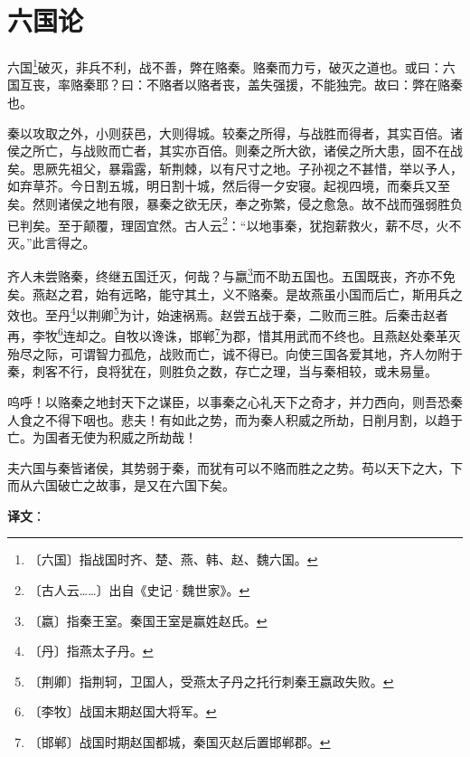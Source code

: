 \documentclass[12pt,UTF-8,openany,a4]{ctexbook}
\begin{document}
\chapter{六国论}

\begin{large}
    
    六国\footnote{〔六国〕\yiwen 指战国时齐、楚、燕、韩、赵、魏六国。}破灭，非兵不利，战不善，弊在赂秦。赂秦而力亏，破灭之道也。或曰：六国互丧，率赂秦耶？曰：不赂者以赂者丧，盖失强援，不能独完。故曰：弊在赂秦也。
    
    秦以攻取之外，小则获邑，大则得城。较秦之所得，与战胜而得者，其实百倍。诸侯之所亡，与战败而亡者，其实亦百倍。则秦之所大欲，诸侯之所大患，固不在战矣。思厥先祖父，暴霜露，斩荆棘，以有尺寸之地。子孙视之不甚惜，举以予人，如弃草芥。今日割五城，明日割十城，然后得一夕安寝。起视四境，而秦兵又至矣。然则诸侯之地有限，暴秦之欲无厌，奉之弥繁，侵之愈急。故不战而强弱胜负已判矣。至于颠覆，理固宜然。古人云\footnote{〔古人云……〕\yiwen 出自《史记·魏世家》。}：“以地事秦，犹抱薪救火，薪不尽，火不灭。”此言得之。
    
    齐人未尝赂秦，终继五国迁灭，何哉？与嬴\footnote{〔嬴〕\yiwen 指秦王室。秦国王室是赢姓赵氏。}而不助五国也。五国既丧，齐亦不免矣。燕赵之君，始有远略，能守其土，义不赂秦。是故燕虽小国而后亡，斯用兵之效也。至丹\footnote{〔丹〕\yiwen \yiwen 指燕太子丹。}以荆卿\footnote{〔荆卿〕\yiwen 指荆轲，卫国人，受燕太子丹之托行刺秦王嬴政失败。}为计，始速祸焉。赵尝五战于秦，二败而三胜。后秦击赵者再，李牧\footnote{〔李牧〕\yiwen 战国末期赵国大将军。}连却之。自牧以谗诛，邯郸\footnote{〔邯郸〕\yiwen 战国时期赵国都城，秦国灭赵后置邯郸郡。}为郡，惜其用武而不终也。且燕赵处秦革灭殆尽之际，可谓智力孤危，战败而亡，诚不得已。向使三国各爱其地，齐人勿附于秦，刺客不行，良将犹在，则胜负之数，存亡之理，当与秦相较，或未易量。
    
    呜呼！以赂秦之地封天下之谋臣，以事秦之心礼天下之奇才，并力西向，则吾恐秦人食之不得下咽也。悲夫！有如此之势，而为秦人积威之所劫，日削月割，以趋于亡。为国者无使为积威之所劫哉！
    
    夫六国与秦皆诸侯，其势弱于秦，而犹有可以不赂而胜之之势。苟以天下之大，下而从六国破亡之故事，是又在六国下矣。

\end{large}


\newpage

\begin{Large}
   \noindent \textbf{译文}：
\end{Large}

\vspace{1em}
\end{document}
